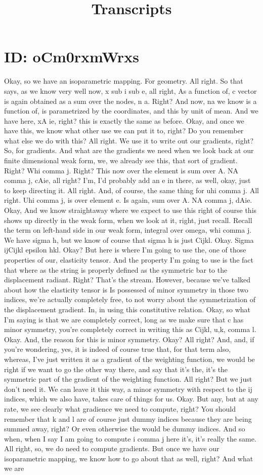 \documentclass[10pt]{article}
\title{Transcripts}
\date{}
\begin{document}
\section*{ID: oCm0rxmWrxs}
Okay, so we have an isoparametric mapping. For geometry. All right. So that says, as we know very well now, x sub i sub e, all right, As a function of, c vector is again obtained as a sum over the nodes, n a. Right? And now, na we know is a function of, is parametrized by the coordinates, and this by unit of mean. And we have here, xA ie, right? this is exactly the same as before. Okay, and once we have this, we know what other use we can put it to, right? Do you remember what else we do with this? All right. We use it to write out our gradients, right? So, for gradients. And what are the gradients we need when we look back at our finite dimensional weak form, we, we already see this, that sort of gradient. Right? Whi comma j. Right? This now over the element is sum over A. NA comma j, cAie, all right? I'm, I'd probably add an e in there, as well, okay, just to keep directing it. All right. And, of course, the same thing for uhi comma j. All right. Uhi comma j, is over element e. Is again, sum over A. NA comma j, dAie. Okay, And we know straightaway where we expect to use this right of course this shows up directly in the weak form, when we look at it, right, just recall. Recall the term on left-hand side in our weak form, integral over omega, whi comma j. We have sigma h, but we know of course that sigma h is just Cijkl. Okay. Sigma ijCijkl epsilon hkl. Okay? But here is where I'm going to use the, one of those properties of our, elasticity tensor. And the property I'm going to use is the fact that where as the string is properly defined as the symmetric bar to the displacement radiant. Right? That's the stream. However, because we've talked about how the elasticity tensor is Is possessed of minor symmetry in those two indices, we're actually completely free, to not worry about the symmetrization of the displacement gradient. In, in using this constitutive relation. Okay, so what I'm saying is that we are completely correct, long as we make sure that c has minor symmetry, you're completely correct in writing this as Cijkl, u,k, comma l. Okay. And, the reason for this is minor symmetry. Okay? All right? And, and, if you're wondering, yes, it is indeed of course true that, for that term also, whereas, I've just written it as a gradient of the weighting function, we would be right if we want to go the other way there, and say that it's the, it's the symmetric part of the gradient of the weighting function. All right? But we just don't need it. We can leave it this way, a minor symmetry with respect to the ij indices, which we also have, takes care of things for us. Okay. But any, but at any rate, we see clearly what gradience we need to compute, right? You should remember that k and l are of course just dummy indices because they are being summed away, right? Or even otherwise the would be dummy indices. And so when, when I say I am going to compute i comma j here it's, it's really the same. All right, so, we do need to compute gradients. But once we have our isoparametric mapping, we know how to go about that as well, right? And what we are 
\end{document}

